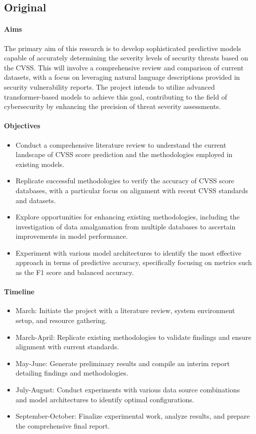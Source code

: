 \documentclass[12pt]{article}
\begin{document}
\subsection{Original}

\paragraph{Aims}
The primary aim of this research is to develop sophisticated predictive models capable of accurately determining
the severity levels of security threats based on the CVSS. This will involve a comprehensive review and comparison
of current datasets, with a focus on leveraging natural language descriptions provided in security vulnerability reports.
The project intends to utilize advanced transformer-based models to achieve this goal, contributing to the field of
cybersecurity by enhancing the precision of threat severity assessments.

\paragraph{Objectives}
\begin{itemize}[noitemsep]
	\item Conduct a comprehensive literature review to understand the current landscape of CVSS score prediction and the methodologies employed in existing models.
	\item Replicate successful methodologies to verify the accuracy of CVSS score databases, with a particular focus on alignment with recent CVSS standards and datasets.
	\item Explore opportunities for enhancing existing methodologies, including the investigation of data amalgamation from multiple databases to ascertain improvements in model performance.
	\item Experiment with various model architectures to identify the most effective approach in terms of predictive accuracy, specifically focusing on metrics such as the F1 score and balanced accuracy.
\end{itemize}

\paragraph{Timeline}
\begin{itemize}[noitemsep]
	\item March: Initiate the project with a literature review, system environment setup, and resource gathering.
	\item March-April: Replicate existing methodologies to validate findings and ensure alignment with current standards.
	\item May-June: Generate preliminary results and compile an interim report detailing findings and methodologies.
	\item July-August: Conduct experiments with various data source combinations and model architectures to identify optimal configurations.
	\item September-October: Finalize experimental work, analyze results, and prepare the comprehensive final report.
\end{itemize}
\end{document}
